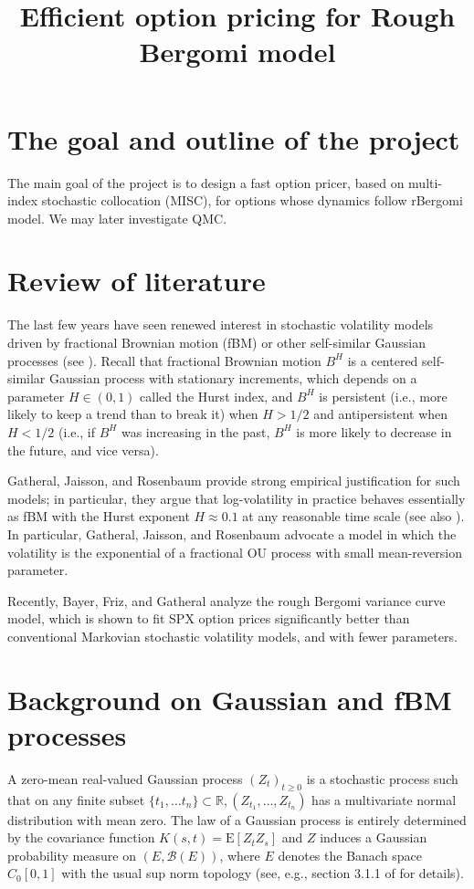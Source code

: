 \documentclass[11pt]{article}
\title{Efficient option pricing for Rough Bergomi model}
\date{ }
\newcommand{\expt}[1]{\mathrm{E}\left[#1\right]}
\newcommand{\rset}{\mathbb{R}}
\begin{document}
\maketitle


\section{The goal and outline of the project}
The main goal of the project is to design a fast option pricer, based on multi-index stochastic collocation (MISC), for options whose dynamics follow rBergomi model. We may later investigate QMC.

\section{Review of literature}


The last few years have seen renewed interest in stochastic volatility models driven by fractional Brownian motion (fBM) or other self-similar Gaussian processes (see  \cite{bayer2016pricing,gatheral2014volatility}). Recall that fractional Brownian motion $B^H$ is a centered self-similar Gaussian process with stationary increments, which depends on a parameter $H \in (0,1)$ called the Hurst index, and $B^H$ is persistent (i.e., more likely to keep a trend than to break it) when $H>1/2$ and antipersistent when $H<1/2$ (i.e., if $B^H$ was increasing in the past, $B^H$ is more likely to decrease in the future, and vice versa). 



Gatheral, Jaisson, and Rosenbaum \cite{gatheral2014volatility} provide strong empirical justification for such models; in particular, they argue that log-volatility in practice behaves essentially as fBM with the Hurst exponent $H \approx 0.1$ at any reasonable time scale (see also  \cite{gatheral2014volatility_2}). In particular, Gatheral, Jaisson, and Rosenbaum \cite{gatheral2014volatility} advocate a model in which the volatility is the exponential of a fractional OU process with small mean-reversion parameter.

Recently, Bayer, Friz, and Gatheral \cite{bayer2016pricing} analyze the rough Bergomi variance curve model, which is shown to fit SPX option prices significantly better than conventional Markovian stochastic volatility models, and with fewer parameters.


\section{Background on Gaussian and fBM processes}
A zero-mean real-valued Gaussian process $(Z_t)_{t\ge0}$ is a stochastic process such that on any finite subset $\{t_1,\dots t_n\} \subset \rset, (Z_{t_1},\dots, Z_{t_n})$ has a
multivariate normal distribution with mean zero. The law of a Gaussian process is entirely determined by the covariance function $K(s, t)= \expt{Z_t Z_s}$ and $Z$ induces a Gaussian probability
measure on $(E, \mathcal{B}(E))$, where $E$ denotes the Banach space $C_0[0,1]$ with the usual sup norm topology (see, e.g., section 3.1.1 of  \cite{carmona2007interest} for details).
\end{document}
